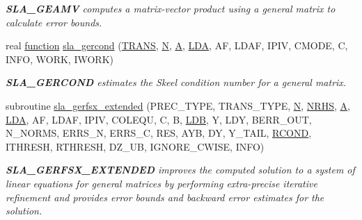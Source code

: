 \begin{DoxyCompactItemize}
\begin{DoxyCompactList}\small\item\em {\bfseries S\+L\+A\+\_\+\+G\+E\+A\+M\+V} computes a matrix-\/vector product using a general matrix to calculate error bounds. \end{DoxyCompactList}\item 
real \hyperlink{afunc_8m_a7b5e596df91eadea6c537c0825e894a7}{function} \hyperlink{group__realGEcomputational_ga0249e1294da0f1991fd57246a8694070}{sla\+\_\+gercond} (\hyperlink{superlu__enum__consts_8h_a0c4e17b2d5cea33f9991ccc6a6678d62a1f61e3015bfe0f0c2c3fda4c5a0cdf58}{T\+R\+A\+N\+S}, \hyperlink{polmisc_8c_a0240ac851181b84ac374872dc5434ee4}{N}, \hyperlink{classA}{A}, \hyperlink{example__user_8c_ae946da542ce0db94dced19b2ecefd1aa}{L\+D\+A}, A\+F, L\+D\+A\+F, I\+P\+I\+V, C\+M\+O\+D\+E, C, I\+N\+F\+O, W\+O\+R\+K, I\+W\+O\+R\+K)
\begin{DoxyCompactList}\small\item\em {\bfseries S\+L\+A\+\_\+\+G\+E\+R\+C\+O\+N\+D} estimates the Skeel condition number for a general matrix. \end{DoxyCompactList}\item 
subroutine \hyperlink{group__realGEcomputational_ga2532e63c32caabae5b7d18e8036514f4}{sla\+\_\+gerfsx\+\_\+extended} (P\+R\+E\+C\+\_\+\+T\+Y\+P\+E, T\+R\+A\+N\+S\+\_\+\+T\+Y\+P\+E, \hyperlink{polmisc_8c_a0240ac851181b84ac374872dc5434ee4}{N}, \hyperlink{example__user_8c_aa0138da002ce2a90360df2f521eb3198}{N\+R\+H\+S}, \hyperlink{classA}{A}, \hyperlink{example__user_8c_ae946da542ce0db94dced19b2ecefd1aa}{L\+D\+A}, A\+F, L\+D\+A\+F, I\+P\+I\+V, C\+O\+L\+E\+Q\+U, C, B, \hyperlink{example__user_8c_a50e90a7104df172b5a89a06c47fcca04}{L\+D\+B}, Y, L\+D\+Y, B\+E\+R\+R\+\_\+\+O\+U\+T, N\+\_\+\+N\+O\+R\+M\+S, E\+R\+R\+S\+\_\+\+N, E\+R\+R\+S\+\_\+\+C, R\+E\+S, A\+Y\+B, D\+Y, Y\+\_\+\+T\+A\+I\+L, \hyperlink{superlu__enum__consts_8h_af00a42ecad444bbda75cde1b64bd7e72a9b5c151728d8512307565994c89919d5}{R\+C\+O\+N\+D}, I\+T\+H\+R\+E\+S\+H, R\+T\+H\+R\+E\+S\+H, D\+Z\+\_\+\+U\+B, I\+G\+N\+O\+R\+E\+\_\+\+C\+W\+I\+S\+E, I\+N\+F\+O)
\begin{DoxyCompactList}\small\item\em {\bfseries S\+L\+A\+\_\+\+G\+E\+R\+F\+S\+X\+\_\+\+E\+X\+T\+E\+N\+D\+E\+D} improves the computed solution to a system of linear equations for general matrices by performing extra-\/precise iterative refinement and provides error bounds and backward error estimates for the solution. \end{DoxyCompactList}\item 

\end{DoxyCompactItemize}
